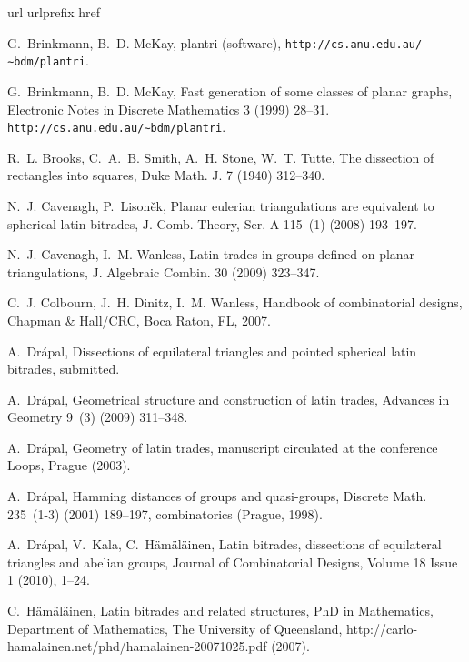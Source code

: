 \documentclass[12pt,amstags,fleqn]{article}
\theoremstyle{plain}
\theoremstyle{definition}
\begin{document}
\begin{thebibliography}{10}
\expandafter\ifx\csname url\endcsname\relax
  \def\url#1{\texttt{#1}}\fi
\expandafter\ifx\csname urlprefix\endcsname\relax\def\urlprefix{URL }\fi
\expandafter\ifx\csname href\endcsname\relax
  \def\href#1#2{#2} \def\path#1{#1}\fi

G.~Brinkmann, B.~D. McKay, plantri (software),
  \url{http://cs.anu.edu.au/∼bdm/plantri}.

G.~Brinkmann, B.~D. McKay, Fast generation of some classes of planar
graphs, Electronic Notes in Discrete Mathematics 3 (1999) 28--31.
  \url{http://cs.anu.edu.au/∼bdm/plantri}.

R.~L. Brooks, C.~A.~B. Smith, A.~H. Stone, W.~T. Tutte, The dissection of
  rectangles into squares, Duke Math. J. 7 (1940) 312--340.

N.~J. Cavenagh, P.~Lison\v ek, Planar eulerian triangulations are equivalent to
  spherical latin bitrades, J. Comb. Theory, Ser. A 115~(1) (2008) 193--197.

N.~J. Cavenagh, I.~M. Wanless, Latin trades in groups defined on planar
  triangulations, J. Algebraic Combin. 30 (2009) 323--347.

C.~J. Colbourn, J.~H. Dinitz, I.~M. Wanless, Handbook of combinatorial designs,
  Chapman \& Hall/CRC, Boca Raton, FL, 2007.

A.~Dr{\'a}pal, Dissections of equilateral triangles and pointed spherical latin
  bitrades, submitted.

A.~Dr{\'a}pal, Geometrical structure and construction of latin trades, Advances
  in Geometry 9~(3) (2009) 311--348.

A.~Dr{\'a}pal, Geometry of latin trades, manuscript circulated at the
  conference Loops, Prague (2003).

A.~Dr{\'a}pal, Hamming distances of groups and quasi-groups, Discrete Math.
  235~(1-3) (2001) 189--197, combinatorics (Prague, 1998).

A.~Dr{\'a}pal, V.~Kala, C.~H\"{a}m\"{a}l\"{a}inen, Latin bitrades,
  dissections of equilateral triangles and abelian groups,
  Journal of Combinatorial Designs, Volume 18 Issue 1 (2010), 1--24.

C.~H\"{a}m\"{a}l\"{a}inen, Latin bitrades and related structures, {PhD} in
  {M}athematics, Department of Mathematics, The University of Queensland,
  http://carlo-hamalainen.net/phd/hamalainen-20071025.pdf (2007).


\end{thebibliography}
\end{document}
